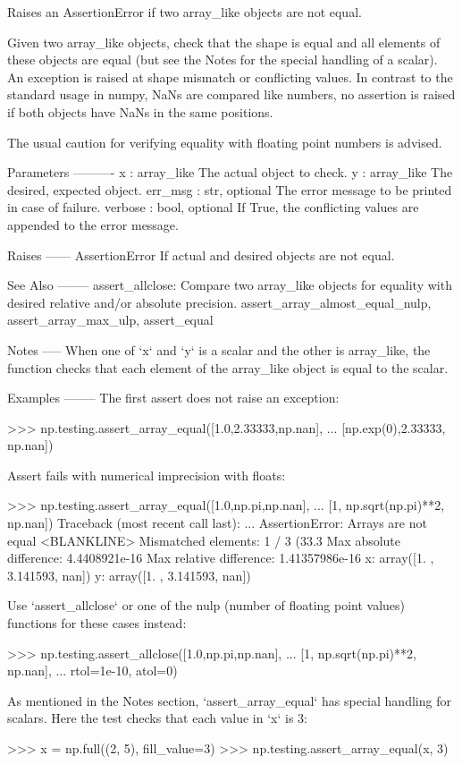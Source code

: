 \begin{DoxyVerb}Raises an AssertionError if two array_like objects are not equal.

Given two array_like objects, check that the shape is equal and all
elements of these objects are equal (but see the Notes for the special
handling of a scalar). An exception is raised at shape mismatch or
conflicting values. In contrast to the standard usage in numpy, NaNs
are compared like numbers, no assertion is raised if both objects have
NaNs in the same positions.

The usual caution for verifying equality with floating point numbers is
advised.

Parameters
----------
x : array_like
    The actual object to check.
y : array_like
    The desired, expected object.
err_msg : str, optional
    The error message to be printed in case of failure.
verbose : bool, optional
    If True, the conflicting values are appended to the error message.

Raises
------
AssertionError
    If actual and desired objects are not equal.

See Also
--------
assert_allclose: Compare two array_like objects for equality with desired
                 relative and/or absolute precision.
assert_array_almost_equal_nulp, assert_array_max_ulp, assert_equal

Notes
-----
When one of `x` and `y` is a scalar and the other is array_like, the
function checks that each element of the array_like object is equal to
the scalar.

Examples
--------
The first assert does not raise an exception:

>>> np.testing.assert_array_equal([1.0,2.33333,np.nan],
...                               [np.exp(0),2.33333, np.nan])

Assert fails with numerical imprecision with floats:

>>> np.testing.assert_array_equal([1.0,np.pi,np.nan],
...                               [1, np.sqrt(np.pi)**2, np.nan])
Traceback (most recent call last):
    ...
AssertionError:
Arrays are not equal
<BLANKLINE>
Mismatched elements: 1 / 3 (33.3%
Max absolute difference: 4.4408921e-16
Max relative difference: 1.41357986e-16
 x: array([1.      , 3.141593,      nan])
 y: array([1.      , 3.141593,      nan])

Use `assert_allclose` or one of the nulp (number of floating point values)
functions for these cases instead:

>>> np.testing.assert_allclose([1.0,np.pi,np.nan],
...                            [1, np.sqrt(np.pi)**2, np.nan],
...                            rtol=1e-10, atol=0)

As mentioned in the Notes section, `assert_array_equal` has special
handling for scalars. Here the test checks that each value in `x` is 3:

>>> x = np.full((2, 5), fill_value=3)
>>> np.testing.assert_array_equal(x, 3)\end{DoxyVerb}
